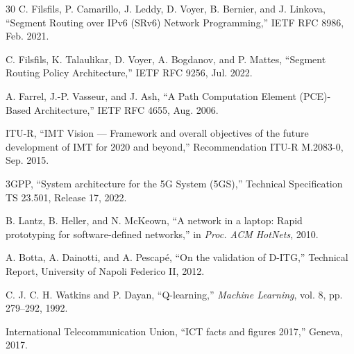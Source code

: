 \documentclass[journal]{IEEEtran}
\begin{document}
\begin{thebibliography}{30}
 C. Filsfils, P. Camarillo, J. Leddy, D. Voyer, B.
Bernier, and J. Linkova, ``Segment Routing over IPv6 (SRv6) Network
Programming,'' IETF RFC 8986, Feb. 2021.

 C. Filsfils, K. Talaulikar, D. Voyer, A. Bogdanov, and P.
Mattes, ``Segment Routing Policy Architecture,'' IETF RFC 9256, Jul. 2022.

 A. Farrel, J.-P. Vasseur, and J. Ash, ``A Path Computation
Element (PCE)-Based Architecture,'' IETF RFC 4655, Aug. 2006.

 ITU-R, ``IMT Vision --- Framework and overall objectives
of the future development of IMT for 2020 and beyond,'' Recommendation
ITU-R M.2083-0, Sep. 2015.

 3GPP, ``System architecture for the 5G System
(5GS),'' Technical Specification TS 23.501, Release 17, 2022.

 B. Lantz, B. Heller, and N. McKeown, ``A network in a
laptop: Rapid prototyping for software-defined networks,'' in \emph{Proc.
ACM HotNets}, 2010.

 A. Botta, A. Dainotti, and A. Pescap\'e, ``On the
validation of D-ITG,'' Technical Report, University of Napoli Federico II,
2012.

 C. J. C. H. Watkins and P. Dayan, ``Q-learning,''
\emph{Machine Learning}, vol. 8, pp. 279--292, 1992.

 International Telecommunication Union, ``ICT facts and
figures 2017,'' Geneva, 2017.

\end{thebibliography}
\end{document}
